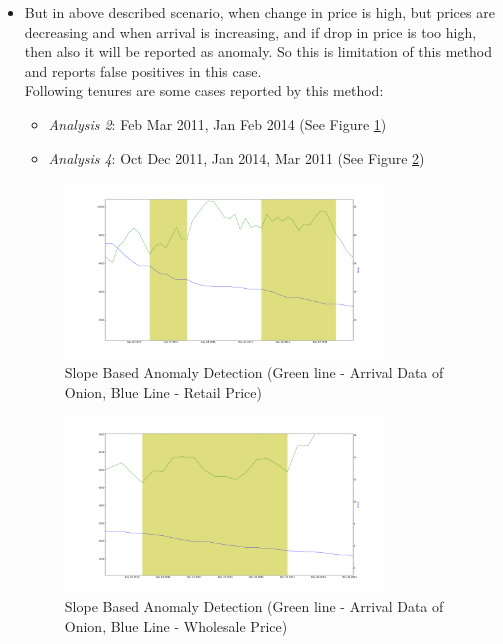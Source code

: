 \begin{itemize}
			\item But in above described scenario, when change in price is high, but prices are decreasing and when arrival is increasing, and if drop in price is too high, then also it will be reported as anomaly.	So this is limitation of this method and reports false positives in this case.\\
			Following tenures are some cases reported by this method:
			
			\begin{itemize}
				\item \textit{Analysis 2}: Feb Mar 2011, Jan Feb 2014 (See Figure \ref{fig:12122})
				\item \textit{Analysis 4}: Oct Dec 2011, Jan 2014, Mar 2011 (See Figure \ref{fig:12142})
			\end{itemize}
			
			\begin{figure}[H]
		    	\centering
  		    	\includegraphics[width=0.8\textwidth]{graphs/12122.png}
		    	\caption{Slope Based Anomaly Detection (Green line - Arrival Data of Onion, Blue Line - Retail Price)}
		    	\label{fig:12122}
			\end{figure}
			
			\begin{figure}[H]
		    	\centering
  		    	\includegraphics[width=0.8\textwidth]{graphs/12142.png}
		    	\caption{Slope Based Anomaly Detection (Green line - Arrival Data of Onion, Blue Line - Wholesale Price)}
		    	\label{fig:12142}
			\end{figure}
			

\end{itemize}
